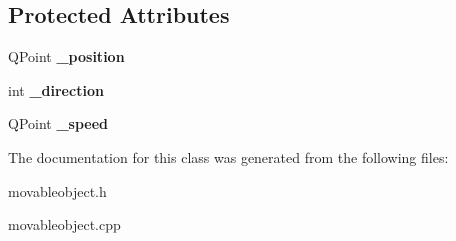 \subsection*{Protected Attributes}
\begin{DoxyCompactItemize}
\item 
\hypertarget{classMovableObject_a9933b4063dbd98809bf268099e714504}{Q\-Point {\bfseries \-\_\-position}}\label{classMovableObject_a9933b4063dbd98809bf268099e714504}

\item 
\hypertarget{classMovableObject_a8464b267992970b197fe83da6b1ca954}{int {\bfseries \-\_\-direction}}\label{classMovableObject_a8464b267992970b197fe83da6b1ca954}

\item 
\hypertarget{classMovableObject_a025fbf9a26bb0157c1017c996dbc32f2}{Q\-Point {\bfseries \-\_\-speed}}\label{classMovableObject_a025fbf9a26bb0157c1017c996dbc32f2}

\end{DoxyCompactItemize}


The documentation for this class was generated from the following files\-:\begin{DoxyCompactItemize}
\item 
movableobject.\-h\item 
movableobject.\-cpp\end{DoxyCompactItemize}
